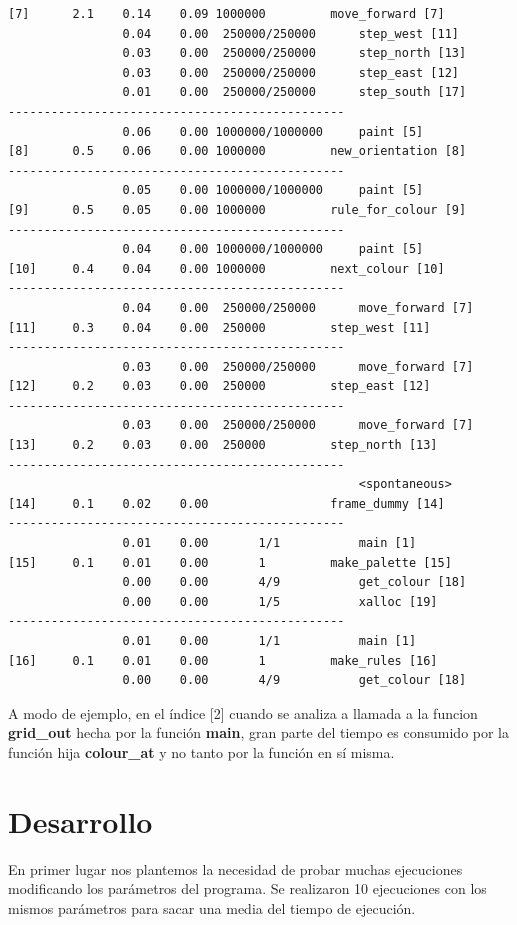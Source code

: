 \documentclass[a4paper, 10pt, twoside, notitlepage]{article}
\begin{document}
\begin{verbatim}
[7]      2.1    0.14    0.09 1000000         move_forward [7]
                0.04    0.00  250000/250000      step_west [11]
                0.03    0.00  250000/250000      step_north [13]
                0.03    0.00  250000/250000      step_east [12]
                0.01    0.00  250000/250000      step_south [17]
-----------------------------------------------
                0.06    0.00 1000000/1000000     paint [5]
[8]      0.5    0.06    0.00 1000000         new_orientation [8]
-----------------------------------------------
                0.05    0.00 1000000/1000000     paint [5]
[9]      0.5    0.05    0.00 1000000         rule_for_colour [9]
-----------------------------------------------
                0.04    0.00 1000000/1000000     paint [5]
[10]     0.4    0.04    0.00 1000000         next_colour [10]
-----------------------------------------------
                0.04    0.00  250000/250000      move_forward [7]
[11]     0.3    0.04    0.00  250000         step_west [11]
-----------------------------------------------
                0.03    0.00  250000/250000      move_forward [7]
[12]     0.2    0.03    0.00  250000         step_east [12]
-----------------------------------------------
                0.03    0.00  250000/250000      move_forward [7]
[13]     0.2    0.03    0.00  250000         step_north [13]
-----------------------------------------------
                                                 <spontaneous>
[14]     0.1    0.02    0.00                 frame_dummy [14]
-----------------------------------------------
                0.01    0.00       1/1           main [1]
[15]     0.1    0.01    0.00       1         make_palette [15]
                0.00    0.00       4/9           get_colour [18]
                0.00    0.00       1/5           xalloc [19]
-----------------------------------------------
                0.01    0.00       1/1           main [1]
[16]     0.1    0.01    0.00       1         make_rules [16]
                0.00    0.00       4/9           get_colour [18]

\end{verbatim}
\normalsize
 A modo de ejemplo, en el índice [2] cuando se analiza a llamada a la funcion \textbf{grid\_out} hecha por la función \textbf{main}, gran parte del tiempo es consumido por la función hija \textbf{colour\_at} y no tanto por la función en sí misma.

\newpage
\section{Desarrollo}
En primer lugar nos plantemos la necesidad de probar muchas ejecuciones modificando los parámetros del programa. Se realizaron 10 ejecuciones con los mismos parámetros para sacar una media del tiempo de ejecución.
\end{document}
